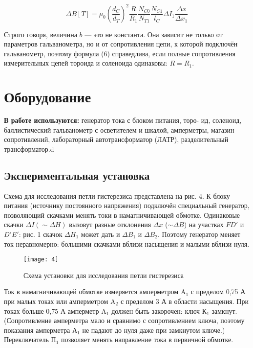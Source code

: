 \begin{equation}
    \Delta B [T] = \mu_0 \left(
    \frac{d_C}{d_T} \right)^2
    \frac{R}{R_1}\frac{N_{C0}}{N_{T1}}\frac{N_{C1}}{l_C}\Delta
    I_1 \frac{\Delta x}{\Delta x_1}
\end{equation}

Строго говоря, величина $b$ — это не
константа. Она зависит не только от
параметров гальванометра, но и от
сопротивления цепи, к которой подключён
гальванометр, поэтому формула (6)
справедлива, если полные сопротивления
измерительных цепей тороида и соленоида
одинаковы: $R = R_1$.

\section{Оборудование}
\textbf{В работе используются:}
генератор тока с блоком питания, торо-
ид, соленоид, баллистический
гальванометр с осветителем и шкалой,
амперметры, магазин сопротивлений,
лабораторный автотрансформатор (ЛАТР),
разделительный трансформатор.d
\subsection*{Экспериментальная установка}
Схема для исследования петли гистерезиса
представлена на рис. 4. К блоку питания
(источнику постоянного напряжения)
подключён специальный генератор,
позволяющий скачками менять токи в
намагничивающей обмотке. Одинаковые
скачки $\Delta I (\sim \Delta H)$ вызовут разные
отклонения $\Delta x$ ($\sim \Delta B$)
на участках $FD'$ и $D'E'$: рис. 1
скачок $\Delta H_1$ может дать и $\Delta
B_1$ 
и $\Delta B_2$. Поэтому генератор меняет ток
неравномерно: большими скачками вблизи
насыщения и малыми вблизи нуля.

\begin{figure}[H]
    \texttt{[image: 4]} 
    \captionsetup{justification=centering}
    \caption{Схема установки для
    исследования петли гистерезиса}
\end{figure}

Ток в намагничивающей обмотке измеряется
амперметром $\text{A}_1$ с пределом 0,75 А при
малых токах или амперметром $\text{A}_2$ с
пределом 3 А в области насыщения. При
токах больше 0,75 А амперметр
$\text{A}_1$ должен
быть закорочен: ключ $\text{К}_1$ замкнут.
(Сопротивление амперметра мало и
сравнимо с сопротивлением ключа, поэтому
показания амперметра $\text{А}_1$ не падают до
нуля даже при замкнутом ключе.)
Переключатель $\text{П}_1$ позволяет менять
направление тока в первичной обмотке.

